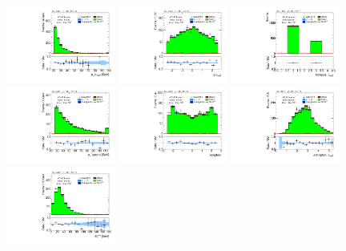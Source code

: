 \begin{figure}[tp]
  \centering
  \includegraphics[width=0.32\textwidth]{figures/analysis/vbf-SSXCR/tau-pt}
  \includegraphics[width=0.32\textwidth]{figures/analysis/vbf-SSXCR/tau-eta}
  \includegraphics[width=0.32\textwidth]{figures/analysis/vbf-SSXCR/tau-numTrack}
  \includegraphics[width=0.32\textwidth]{figures/analysis/vbf-SSXCR/lep-pt-hi}
  \includegraphics[width=0.32\textwidth]{figures/analysis/vbf-SSXCR/lep-eta}
  \includegraphics[width=0.32\textwidth]{figures/analysis/vbf-SSXCR/taulep-dR}
  \includegraphics[width=0.32\textwidth]{figures/analysis/vbf-SSXCR/met-pt-hi}

\end{figure}
